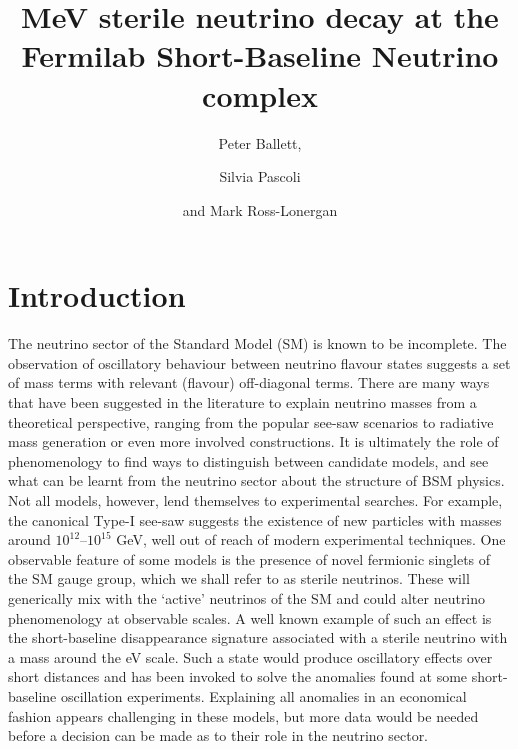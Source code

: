 \documentclass[11pt, a4paper]{article}
\title{MeV sterile neutrino decay at the Fermilab Short-Baseline Neutrino complex}
\author{Peter Ballett,}
\author{Silvia Pascoli}
\author{and Mark Ross-Lonergan}
\affiliation{Institute for Particle Physics Phenomenology, Department of
Physics, Durham University, South Road, Durham DH1 3LE, United Kingdom}
\begin{document}
 

\maketitle

\section{Introduction}

The neutrino sector of the Standard Model (SM) is known to be incomplete. The
observation of oscillatory behaviour between neutrino flavour states suggests a
set of mass terms with relevant (flavour) off-diagonal terms. There are many
ways that have been suggested in the literature to explain neutrino masses from
a theoretical perspective, ranging from the popular see-saw scenarios to
radiative mass generation or even more involved constructions. It is ultimately
the role of phenomenology to find ways to distinguish between candidate models,
and see what can be learnt from the neutrino sector about the structure of BSM
physics.
%
Not all models, however, lend themselves to experimental searches. For example,
the canonical Type-I see-saw \cite{Minkowski:1977sc, GellMann:1980vs,
Mohapatra:1979ia} suggests the existence of new particles with masses around
$10^{12}$--$10^{15}$ GeV, well out of reach of modern experimental techniques. One
observable feature of some models is the presence of novel fermionic singlets
of the SM gauge group, which we shall refer to as sterile neutrinos. These will
generically mix with the `active' neutrinos of the SM and could alter neutrino
phenomenology at observable scales. 
%
A well known example of such an effect is the short-baseline disappearance
signature associated with a sterile neutrino with a mass around the eV scale. Such a state
would produce oscillatory effects over short distances and has been invoked to
solve the anomalies found at some short-baseline oscillation experiments.
Explaining all anomalies in an economical fashion appears challenging in these
models, but more data would be needed before a decision can be made as to their
role in the neutrino sector.
\end{document}
